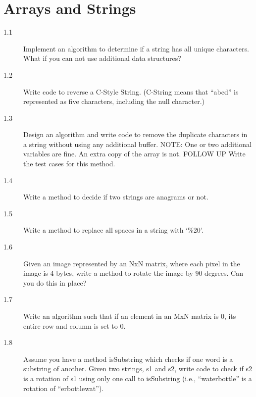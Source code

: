 \chapter{Arrays and Strings}

\begin{description}
\item[1.1] Implement an algorithm to determine if a string has all unique characters. What if you can not use additional data structures?



\item[1.2] Write code to reverse a C-Style String. (C-String means that “abcd” is represented as five characters, including the null character.)


\newpage
\item[1.3] Design an algorithm and write code to remove the duplicate characters in a string without using any additional buffer. NOTE: One or two additional variables are fine. An extra copy of the array is not. FOLLOW UP Write the test cases for this method.


\newpage
\item[1.4] Write a method to decide if two strings are anagrams or not.


\newpage
\item[1.5] Write a method to replace all spaces in a string with ‘\%20’.


\item[1.6] Given an image represented by an NxN matrix, where each pixel in the image is 4 bytes, write a method to rotate the image by 90 degrees. Can you do this in place?


\item[1.7] Write an algorithm such that if an element in an MxN matrix is 0, its entire row and column is set to 0.


\item[1.8] Assume you have a method isSubstring which checks if one word is a substring of another. Given two strings, s1 and s2, write code to check if s2 is a rotation of s1 using only one call to isSubstring (i.e., “waterbottle” is a rotation of “erbottlewat”).


\end{description}
